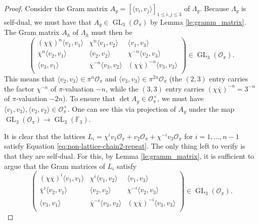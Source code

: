 \documentclass{eptcs}
\theoremstyle{remark}
\theoremstyle{definition}
\DeclareMathOperator{\GL}{GL}
\begin{document}
\begin{proof}
    Consider the Gram matrix $A_{g} = [\langle v_{i}, v_{j}\rangle]_{1 \leq i,j \leq 3}$ of $\Lambda_{g}$. Because $\Lambda_{g}$ is self-dual, we must have that $A_{g} \in \GL_{3}(\mathcal{O}_{\pi})$ by Lemma \ref{le:gramm_matrix}.
    The Gram matrix $A_{h}$ of $\Lambda_{h}$ must then be 
    \begin{equation}
        \begin{pmatrix}
	    (\chi \overline{\chi})^{n}\langle v_{1} , v_{1}\rangle &  \chi^{n}\langle v_{1}, v_{2}\rangle & \langle v_{1} ,v_{3}\rangle \\
	    \overline{\chi}^{n}\langle v_{2} , v_{1}\rangle & \langle v_{2}, v_{2}\rangle & \chi^{-n }\langle v_{2} ,v_{3}\rangle \\
	    \langle v_{3} , v_{1}\rangle &  \overline{\chi}^{-n}\langle v_{3}, v_{2}\rangle & (\chi \overline{\chi})^{-n} \langle v_{3} ,v_{3}\rangle \\
        \end{pmatrix} \in \GL_{3}(\mathcal{O}_{\pi}).
    \end{equation}
    This means that $\langle v_{2}, v_{3} \rangle \in \pi^{n} \mathcal{O}_{\pi}$ and $\langle v_{3}, v_{3}\rangle \in \pi^{2n} \mathcal{O}_{\pi}$ (the $(2,3)$ entry carries the factor $\chi^{-n}$ of $\pi$-valuation $-n$, while the $(3,3)$ entry carries $(\chi\overline{\chi})^{-n}=3^{-n}$ of $\pi$-valuation $-2n$). To ensure that $\det A_{g} \in \mathcal{O}_{\pi}^{\times}$, we must have $\langle v_{1},v_{3} \rangle , \langle v_{2},v_{2}\rangle \in \mathcal{O}_{\pi}^{\times}$. One can see this via projection of $A_{g}$ under the map $\GL_{3}(\mathcal{O}_{\pi})\rightarrow  \GL_{3}(\mathbb{F}_{3})$.

    It is clear that the lattices $L_{i} = \chi^{i} v_{1} \mathcal{O}_{\pi} + v_{2} \mathcal{O}_{\pi} + \chi^{-i} v_{3} \mathcal{O}_{\pi}$ for $i=1,\dots,n-1$ satisfy Equation \ref{eq:non-lattice-chain2-repeat}. The only thing left to verify is that they are self-dual. For this, by Lemma \ref{le:gramm_matrix}, it is sufficient to argue that the Gram matrices of $L_{i}$ satisfy
    \begin{equation}
        \begin{pmatrix}
	    (\chi \overline{\chi})^{i}\langle v_{1} , v_{1}\rangle &  \chi^{i}\langle v_{1}, v_{2}\rangle & \langle v_{1} ,v_{3}\rangle \\
	    \overline{\chi}^{i}\langle v_{2} , v_{1}\rangle & \langle v_{2}, v_{2}\rangle & \chi^{-i }\langle v_{2} ,v_{3}\rangle \\
	    \langle v_{3} , v_{1}\rangle &  \overline{\chi}^{-i}\langle v_{3}, v_{2}\rangle & (\chi \overline{\chi})^{-i} \langle v_{3} ,v_{3}\rangle \\
        \end{pmatrix} \in \GL_{3}(\mathcal{O}_{\pi}).
    \end{equation}
\end{proof}
\end{document}
